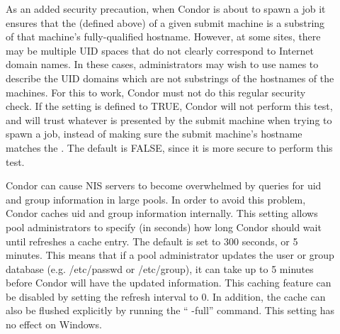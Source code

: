 \begin{description}
\item[]
  \label{param:TrustUidDomain}
  As an added security precaution, when Condor is about to spawn a job
  it ensures that the  (defined above) of a given
  submit machine is a substring of that machine's fully-qualified
  hostname.
  However, at some sites, there may be multiple UID spaces that do
  not clearly correspond to Internet domain names.
  In these cases, administrators may wish to use names to describe the
  UID domains which are not substrings of the hostnames of the
  machines.
  For this to work, Condor must not do this regular security check.
  If the  setting is defined to TRUE,
  Condor will not perform this test, and will trust whatever
   is presented by the submit machine when trying
  to spawn a job, instead of making sure the submit machine's hostname
  matches the .
  The default is FALSE, since it is more secure to perform this test. 

\item[]
  \label{param:PasswdCacheRefresh}
  Condor can cause NIS servers to become overwhelmed by queries for uid
  and group information in large pools. In order to avoid this problem,
  Condor caches uid and group information internally. This setting allows
  pool administrators to specify (in seconds) how long Condor should wait
  until refreshes a cache entry. The default is set to 300 seconds, or
  5 minutes. This means that if a pool administrator updates the user
  or group database (e.g. /etc/passwd or /etc/group), it can take up
  to 5 minutes before Condor will have the updated information. This
  caching feature can be disabled by setting the refresh interval to
  0. In addition, the cache can also be flushed explicitly by running
  the `` -full'' command. This setting has no effect
  on Windows.

\end{description}


